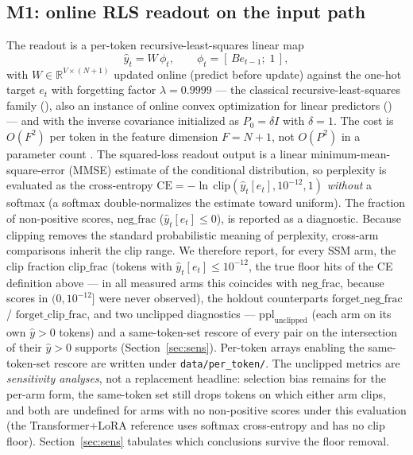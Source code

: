 \documentclass[preprint,12pt]{elsarticle}
\begin{document}
\subsection{M1: online RLS readout on the input path}
\label{sec:m1}

The readout is a per-token recursive-least-squares linear map
\begin{equation}
\hat{y}_t = W\, \phi_t, \qquad \phi_t = [\,B e_{t-1};\; 1\,],
\label{eq:readout}
\end{equation}
with $W \in \mathbb{R}^{V \times (N+1)}$ updated online (predict
before update) against the one-hot target $e_t$ with forgetting factor
$\lambda = 0.9999$ --- the classical recursive-least-squares family
(\cite{ljung1983,haykin2002,goodwin1984}), also an instance of online
convex optimization for linear predictors
(\cite{zinkevich2003,cesabianchi2006}) --- and with the inverse
covariance initialized as $P_0 = \delta I$ with $\delta = 1$. The cost
is $O(F^2)$ per token in the feature
dimension $F = N+1$, not $O(P^2)$ in a parameter count
\cite{redemb,redemc}. The squared-loss readout output is a linear
minimum-mean-square-error (MMSE)
estimate of the conditional distribution, so perplexity is evaluated as
the cross-entropy
$\mathrm{CE} = -\ln\,\mathrm{clip}(\hat{y}_t[e_t], 10^{-12}, 1)$
\emph{without} a softmax (a softmax double-normalizes the estimate
toward uniform).
The fraction of non-positive scores, $\mathrm{neg\_frac}$
($\hat y_t[e_t]\le 0$), is reported as a diagnostic. Because clipping
removes the standard probabilistic
meaning of perplexity, cross-arm comparisons inherit the clip range.
We therefore report, for every SSM arm, the clip fraction
$\mathrm{clip\_frac}$ (tokens with $\hat y_t[e_t]\le10^{-12}$, the
true floor hits of the CE definition above --- in all measured arms this
coincides with $\mathrm{neg\_frac}$, because scores in
$(0,10^{-12}]$ were never observed),
the holdout counterparts $\mathrm{forget\_neg\_frac}$ /
$\mathrm{forget\_clip\_frac}$, and two unclipped diagnostics ---
$\mathrm{ppl}_{\mathrm{unclipped}}$ (each arm on its own
$\hat y>0$ tokens) and a same-token-set rescore of every pair on the
intersection of their $\hat y>0$ supports (Section~\ref{sec:sens}).
Per-token arrays enabling the same-token-set rescore are written under
\texttt{data/per\_token/}. The
unclipped metrics are \emph{sensitivity analyses}, not a replacement
headline: selection bias remains for the per-arm form, the same-token
set still drops tokens on which either arm clips, and both are
undefined for arms with no
non-positive scores under this evaluation (the Transformer+LoRA
reference uses softmax cross-entropy and has no clip floor).
Section~\ref{sec:sens} tabulates which conclusions survive the floor
removal.
\end{document}

